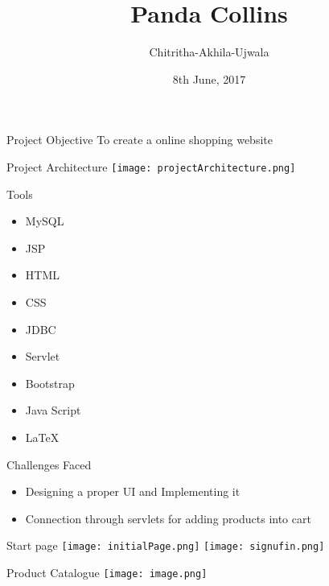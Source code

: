 \documentclass[14pt]{beamer}
\title{Panda Collins}
\author{Chitritha-Akhila-Ujwala}
\institute{BVRITH}
\date{8th June, 2017}
\begin{document}
\begin{frame}
   \titlepage
\end{frame}

\begin{frame}{Project Objective}
To create a online shopping website
\end{frame}

\begin{frame}{Project Architecture}
    \texttt{[image: projectArchitecture.png]}
\end{frame}


\begin{frame}{Tools}
   \begin{itemize}
    \item{MySQL}
    \item{JSP}
    \item{HTML}
    \item{CSS}
    \item{JDBC}
    \item{Servlet}
    \item{Bootstrap}
    \item{Java Script} 
    \item{LaTeX}
   \end{itemize}
\end{frame}

\begin{frame}{Challenges Faced}
    \begin{itemize}
        \item{Designing a proper UI and Implementing it}
        \item{Connection through servlets for adding products into cart }
    \end{itemize}
\end{frame}

\begin{frame}{Start page}
    \texttt{[image: initialPage.png]}
    \texttt{[image: signufin.png]}
\end{frame}

\begin{frame}{Product Catalogue}
\texttt{[image: image.png]}
\end{frame}
\end{document}
